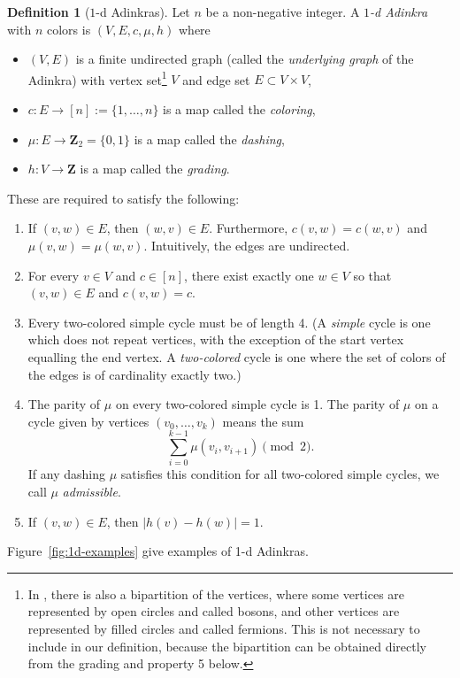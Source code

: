 \documentclass[12pt,twoside,singlespace]{article}
\numberwithin{equation}{section}
\theoremstyle{definition}
\newtheorem{definition}[equation]{Definition}
\newcommand{\ZZ}{\mathbf{Z}}
\begin{document}
\begin{definition}[$1$-d Adinkras]
Let $n$ be a non-negative integer.  A \emph{$1$-d Adinkra} with $n$ colors is $(V,E,c,\mu,h)$ where
\begin{itemize}
\item $(V,E)$ is a finite undirected graph (called the \emph{underlying graph} of the Adinkra) with vertex set\footnote{In \cite{d2l:first,d2l:graph-theoretic}, there is also a bipartition of the vertices, where some vertices are represented by open circles and called bosons, and other vertices are represented by filled circles and called fermions.  This is not necessary to include in our definition, because the bipartition can be obtained directly from the grading and property 5 below.}
 $V$ and edge set $E\subset V\times V$,
\item $c:E\to [n] := \{1,\ldots,n\}$ is a map called the \emph{coloring},
\item $\mu:E\to \ZZ_2=\{0,1\}$ is a map called the \emph{dashing},
\item $h:V\to\ZZ$ is a map called the \emph{grading}.
\end{itemize}

These are required to satisfy the following:
\begin{enumerate}
\item If $(v,w)\in E$, then $(w,v)\in E$.  Furthermore, $c(v,w)=c(w,v)$ and $\mu(v,w)=\mu(w,v)$.  Intuitively, the edges are undirected.
\item For every $v\in V$ and $c\in [n]$, there exist exactly one $w\in V$ so that $(v,w)\in E$ and $c(v,w)=c$.
\item Every two-colored simple cycle must be of length 4.  (A \emph{simple} cycle is one which does not repeat vertices, with the exception of the start vertex equalling the end vertex.  A \emph{two-colored} cycle is one where the set of colors of the edges is of cardinality exactly two.)
\item The parity of $\mu$ on every two-colored simple cycle is 1.  The parity of $\mu$ on a cycle given by vertices $(v_0,\ldots,v_k)$ means the sum
\[\sum_{i=0}^{k-1}\mu(v_i,v_{i+1})\pmod{2}.\]
If any dashing $\mu$ satisfies this condition for all two-colored simple cycles, we call $\mu$ \emph{admissible}.
\item If $(v,w)\in E$, then $|h(v)-h(w)|=1$.
\end{enumerate}

Figure~\ref{fig:1d-examples} give examples of 1-d Adinkras.
\end{definition}
\end{document}
